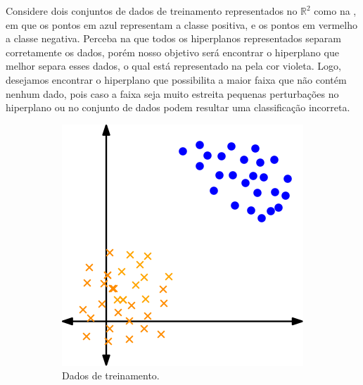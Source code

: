 \documentclass[12pt,a4paper]{scrartcl}
\def\RR{\mathds{R}}
\theoremstyle{definition}%
\begin{document}
Considere dois conjuntos de dados de treinamento representados no $\RR^2$ como na , em que os pontos em azul representam a classe positiva, e os pontos em vermelho a classe negativa. Perceba na  que todos os hiperplanos representados separam corretamente os dados, porém nosso objetivo será encontrar o hiperplano que melhor separa esses dados, o qual está representado na  pela cor violeta. Logo, desejamos encontrar o hiperplano que possibilita a maior faixa que não contém nenhum dado, pois caso a faixa seja muito estreita pequenas perturbações no hiperplano ou no conjunto de dados podem resultar uma classificação incorreta. 
\begin{figure}[htbp] 
	\centering
	\begin{subfigure}[h]{0.38\textwidth}
		\centering
		\includegraphics[width=\textwidth]{dados_treinamento}
		\caption{Dados de treinamento. \label{fig:dados_e_hiperplanos:dados_treinamento}}
	\end{subfigure}
	\begin{subfigure}[h]{0.38\textwidth}
		\centering

\end{subfigure}
\end{figure}
\end{document}
